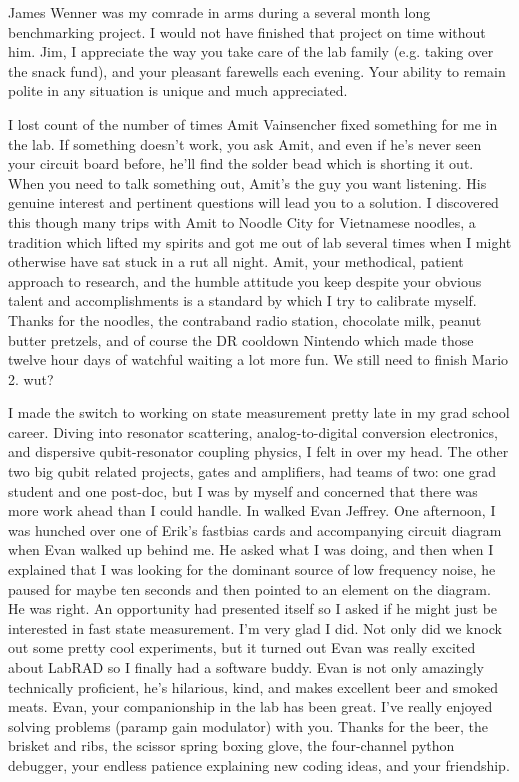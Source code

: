 \begin{acknowledgements}
James Wenner was my comrade in arms during a several month long benchmarking project.
I would not have finished that project on time without him.
Jim, I appreciate the way you take care of the lab family (e.g. taking over the snack fund), and your pleasant farewells each evening.
Your ability to remain polite in any situation is unique and much appreciated.

I lost count of the number of times Amit Vainsencher fixed something for me in the lab.
If something doesn't work, you ask Amit, and even if he's never seen your circuit board before, he'll find the solder bead which is shorting it out.
When you need to talk something out, Amit's the guy you want listening.
His genuine interest and pertinent questions will lead you to a solution.
I discovered this though many trips with Amit to Noodle City for Vietnamese noodles, a tradition which lifted my spirits and got me out of lab several times when I might otherwise have sat stuck in a rut all night.
Amit, your methodical, patient approach to research, and the humble attitude you keep despite your obvious talent and accomplishments is a standard by which I try to calibrate myself.
Thanks for the noodles, the contraband radio station, chocolate milk, peanut butter pretzels, and of course the DR cooldown Nintendo which made those twelve hour days of watchful waiting a lot more fun.
We still need to finish Mario 2.
wut?

I made the switch to working on state measurement pretty late in my grad school career.
Diving into resonator scattering, analog-to-digital conversion electronics, and dispersive qubit-resonator coupling physics, I felt in over my head.
The other two big qubit related projects, gates and amplifiers, had teams of two: one grad student and one post-doc, but I was by myself and concerned that there was more work ahead than I could handle.
In walked Evan Jeffrey.
One afternoon, I was hunched over one of Erik's fastbias cards and accompanying circuit diagram when Evan walked up behind me.
He asked what I was doing, and then when I explained that I was looking for the dominant source of low frequency noise, he paused for maybe ten seconds and then pointed to an element on the diagram.
He was right.
An opportunity had presented itself so I asked if he might just be interested in fast state measurement.
I'm very glad I did.
Not only did we knock out some pretty cool experiments, but it turned out Evan was really excited about LabRAD so I finally had a software buddy.
Evan is not only amazingly technically proficient, he's hilarious, kind, and makes excellent beer and smoked meats.
Evan, your companionship in the lab has been great.
I've really enjoyed solving problems (paramp gain modulator) with you.
Thanks for the beer, the brisket and ribs, the scissor spring boxing glove, the four-channel python debugger, your endless patience explaining new coding ideas, and your friendship.


\end{acknowledgements}
